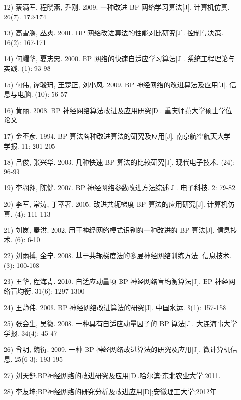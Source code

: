 \documentclass[UTF8]{ctexart}
\begin{document}
\begin{itemize}
\item [12)]
蔡满军,  程晓燕,  乔刚. 2009.  一种改进 BP 网络学习算法[J].  计算机仿真. 26(7): 172-174
\item [13)]
高雪鹏,  丛爽. 2001. BP 网络改进算法的性能对比研究[J].  控制与决策. 16(2): 167-171 
\item [14)]
何耀华,  夏志忠.  2000.  BP 网络的快速自适应学习算法[J].  系统工程理论与实践.  (1): 
93-98 
\item [15)]
何伟,  谭骏珊,  王楚正,  刘小风.  2009.  BP 神经网络的改进算法及应用[J].  信息与电脑. 
(10): 56-57 
\item [16)]
黄丽. 2008. BP 神经网络算法改进及应用研究[D].  重庆师范大学硕士学位论文
\item [17)]
金丕彦.  1994.  BP 算法各种改进算法的研究及应用[J].  南京航空航天大学学报.  11: 
201-205 
\item [18)]
吕俊,  张兴华. 2003.  几种快速 BP 算法的比较研究[J].  现代电子技术. (24): 96-99 
\item [19)]
李翱翔,  陈健. 2007. BP 神经网络参数改进方法综述[J].  电子科技. 2: 79-82 
\item [20)]
李军,  常涛,  丁萃著.  2005.  改进共轭梯度 BP 算法的应用研究[J].  计算机仿真.  (4): 
111-113 
\item [21)]
刘岚,  秦洪. 2002.  用于神经网络模式识别的一种改进的 BP 算法[J].  信息技术. (6): 6-10 
\item [22)]
刘雨搏,  金宁. 2008.  基于共轭梯度法的多层神经网络训练方法.  信息技术. (3): 100-108 
\item [23)]
王华,  程海青.  2010.  自适应动量项  BP  神经网络盲均衡算法[J].  BP  神经网络盲均衡. 
31(6): 1297-1300 
\item [24)]
王静伟. 2008. BP  神经网络改进算法的研究[J].  中国水运. 8(1): 157-158 
\item [25)]
张会生,  吴微. 2008.  一种具有自适应动量因子的  BP  算法[J].  大连海事大学学报. 34(4): 
45-47
\item [26)]
曾明,  魏衍.  2009.  一种 BP 神经网络改进算法的研究及应用[J].  微计算机信息.  25(6-3): 
193-195 
\item [27)]
刘天舒.BP神经网络的改进研究及应用[D].哈尔滨:东北农业大学.2011.
\item [28)]
李友坤;BP神经网络的研究分析及改进应用[D];安徽理工大学;2012年

\end{itemize}
\end{document}
